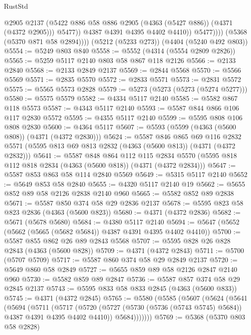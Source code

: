 \begin{lexlean}{RustStd}
\begin{coremodule}
                        @2905
                        @2137
                        (@5422 @886 @58 @886 @2905 (@4363 (@5427 @886)) (@4371 (@4372 @2905)))
                        @5477))
                    @4387
                    @4391
                    @4395
                    @4402
                    @4410))
                @5477))))
        (@5368 (@5370 @871 @58 @2894))))
    (@5212 (@5233 @273))
    (@4404 (@5240 @492 @803))
@5554 := @5249 @803 @840
@5558 := @5552 (@4314 (@5554 @2809 @2826))
@5565 := @5259 @5117 @2140 @803 @58 @867 @118 @2126
@5566 := @2133 @2840
@5568 := @2133 @2849 @2137
@5569 := @2844 @5568
@5570 := @5566 @5569
@5571 := @2835 @5570
@5572 := @2833 @5571
@5573 := @2831 @5572
@5575 := @5565 @5573 @2828
@5579 := @5273 (@5273 (@5273 (@5274 @5277)))
@5580 := @5575 @5579
@5582 := @4334 @5117 @2140
@5585 := @5582 @867 @118 @5573
@5587 := @4343 @5117 @2140
@5593 := @5587 @844 @866 @106 @117 @2830 @5572
@5595 := @4355 @5117 @2140
@5599 := @5595 @808 @106 @808 @2830
@5600 := @4364 @5117
@5607 := @5593 (@5599 (@4363 (@5600 @808)) (@4371 (@4372 @2830)))
@5624 := @5587
    @846
    @865
    @69
    @116
    @2832
    @5571
    (@5595 @813 @69 @813 @2832 (@4363 (@5600 @813)) (@4371 (@4372 @2832)))
@5641 := @5587
    @848
    @864
    @112
    @115
    @2834
    @5570
    (@5595 @818 @112 @818 @2834 (@4363 (@5600 @818)) (@4371 (@4372 @2834)))
@5647 := @5587 @853 @863 @58 @114 @2840 @5569
@5649 := @5315 @5117 @2140
@5652 := @5649 @853 @58 @2840
@5655 := @4320 @5117 @2140 @19
@5662 := @5655 @852 @89 @58 @2126 @2838 @2140 @960
@5665 := @5582 @852 @89 @2838
@5671 := @5587 @850 @374 @58 @29 @2836 @2137
@5678 := @5595 @823 @58 @823 @2836 (@4363 (@5600 @823))
@5680 := @4371 (@4372 @2836)
@5682 := @5671 (@5678 @5680)
@5684 := @4380 @5117 @2140
@5694 := @5647 (@5652 (@5662 (@5665 (@5682 @5684)) @4387 @4391 @4395 @4402 @4410))
@5700 := @5587 @855 @862 @26 @89 @2843 @5568
@5707 := @5595 @828 @26 @828 @2843 (@4363 (@5600 @828))
@5709 := @4371 (@4372 @2843)
@5711 := @5700 (@5707 @5709)
@5717 := @5587 @860 @374 @58 @29 @2849 @2137
@5720 := @5649 @860 @58 @2849
@5727 := @5655 @859 @89 @58 @2126 @2847 @2140 @960
@5730 := @5582 @859 @89 @2847
@5736 := @5587 @857 @374 @58 @29 @2845 @2137
@5743 := @5595 @833 @58 @833 @2845 (@4363 (@5600 @833))
@5745 := @4371 (@4372 @2845)
@5765 := @5580
    (@5585
      (@5607
        (@5624
          (@5641
            (@5694
              (@5711
                (@5717
                  (@5720 (@5727 (@5730 (@5736 (@5743 @5745) @5684)) @4387 @4391 @4395 @4402 @4410))
                  @5684)))))))
@5769 := @5368 (@5370 @803 @58 @2828)

\end{coremodule}
\end{lexlean}

